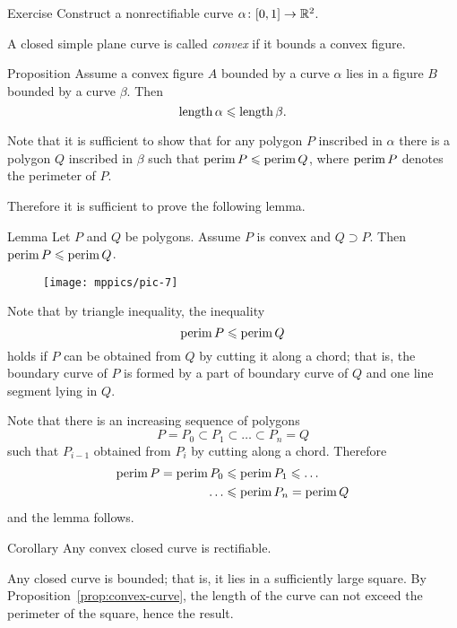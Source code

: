 \begin{thm}{Exercise}\label{ex:nonrectifiable-curve}
Construct a nonrectifiable curve $\alpha\colon[0,1]\to\mathbb{R}^2$.
\end{thm}

A closed simple plane curve is called \emph{convex} if it bounds a convex figure.

\begin{thm}{Proposition}\label{prop:convex-curve}
Assume a convex figure $A$ bounded by a curve $\alpha$ lies in a figure $B$ bounded by a curve $\beta$.
Then
\[\mathop{\rm length}\nolimits\alpha\leqslant \mathop{\rm length}\nolimits\beta.\]
\end{thm}

Note that it is sufficient to show that for any polygon  $P$ inscribed in $\alpha$ there is a polygon $Q$ inscribed in $\beta$ such that 
$\mathop{\rm perim}\nolimits P\leqslant \mathop{\rm perim}\nolimits Q$, where $\mathop{\rm perim}\nolimits P$ denotes the perimeter of $P$.

Therefore it is sufficient to prove the following lemma.

\begin{thm}{Lemma}\label{lem:perimeter}
Let $P$ and $Q$ be polygons.
Assume $P$ is convex and $Q\supset P$.
Then $\mathop{\rm perim}\nolimits P\leqslant \mathop{\rm perim}\nolimits Q$.
\end{thm}

\begin{wrapfigure}{r}{24 mm}
\vskip-4mm
\centering
\texttt{[image: mppics/pic-7]}
\end{wrapfigure}

Note that by triangle inequality,
the inequality
\[\mathop{\rm perim}\nolimits P\leqslant \mathop{\rm perim}\nolimits Q\]
holds
if $P$ can be obtained from $Q$ by cutting it along a chord;
that is, the boundary curve of $P$ is formed by a part of boundary curve of $Q$ and one line segment lying in $Q$.

Note that there is an increasing sequence of polygons 
$$P=P_0\subset P_1\subset\dots\subset P_n=Q$$
such that $P_{i-1}$ obtained from $P_{i}$ by cutting along a chord.
Therefore 
\begin{align*}
\mathop{\rm perim}\nolimits P=\mathop{\rm perim}\nolimits P_0&\leqslant\mathop{\rm perim}\nolimits P_1\leqslant\dots
\\
\dots&\leqslant\mathop{\rm perim}\nolimits P_n=\mathop{\rm perim}\nolimits Q
\end{align*}
and the lemma follows.
\qeds

\begin{thm}{Corollary}
Any convex closed curve is rectifiable.  
\end{thm}

Any closed curve is bounded; that is, it lies in a sufficiently large square.
By Proposition~\ref{prop:convex-curve}, the length of the curve can not exceed the perimeter of the square, hence the result.
\qeds

